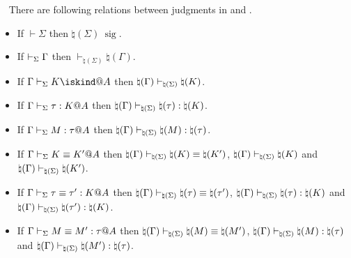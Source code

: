 \begin{lemma}\
    \label{lemma:PreservationOfJudgementsInNatural}
    There are following relations between judgments in \LMD and .
    \begin{itemize}
        \item If \( \vdash \Sigma \) then \( \natural(\Sigma)\ \operatorname{sig} \).
        \item If \( \vdash_\Sigma \Gamma \) then \( \vdash_{\natural(\Sigma)} \natural(\Gamma) \).
        \item If \( \G \V K \iskind@A \) then \( \natural(\Gamma) \vdash_{\natural(\Sigma)} \natural(K) \).
        \item If \( \Gamma \vdash_\Sigma \tau : K @ A \) then \( \natural(\Gamma) \vdash_{\natural(\Sigma)} \natural(\tau) : \natural(K) \).
        \item If \( \Gamma \vdash_\Sigma M : \tau @ A \) then \( \natural(\Gamma) \vdash_{\natural(\Sigma)} \natural(M) : \natural(\tau) \).
        \item If \( \Gamma \vdash_\Sigma K \equiv K' @ A \) then \( \natural(\Gamma) \vdash_{\natural(\Sigma)} \natural(K) \equiv \natural(K') \), \( \natural(\Gamma) \vdash_{\natural(\Sigma)} \natural(K) \) and \( \natural(\Gamma) \vdash_{\natural(\Sigma)} \natural(K') \).
        \item If \( \Gamma \vdash_\Sigma \tau \equiv \tau' : K @ A \) then \( \natural(\Gamma) \vdash_{\natural(\Sigma)} \natural(\tau) \equiv \natural(\tau') \), \( \natural(\Gamma) \vdash_{\natural(\Sigma)} \natural(\tau) : \natural(K) \) and \( \natural(\Gamma) \vdash_{\natural(\Sigma)} \natural(\tau') : \natural(K) \).
        \item If \({ \Gamma \vdash_\Sigma M \equiv M' : \tau @ A }\) then \({ \natural(\Gamma) \vdash_{\natural(\Sigma)} \natural(M) \equiv \natural(M') }\), \({ \natural(\Gamma) \vdash_{\natural(\Sigma)} \natural(M) : \natural(\tau) }\) and \({ \natural(\Gamma) \vdash_{\natural(\Sigma)} \natural(M') : \natural(\tau) }\).
    \end{itemize}
\end{lemma}

